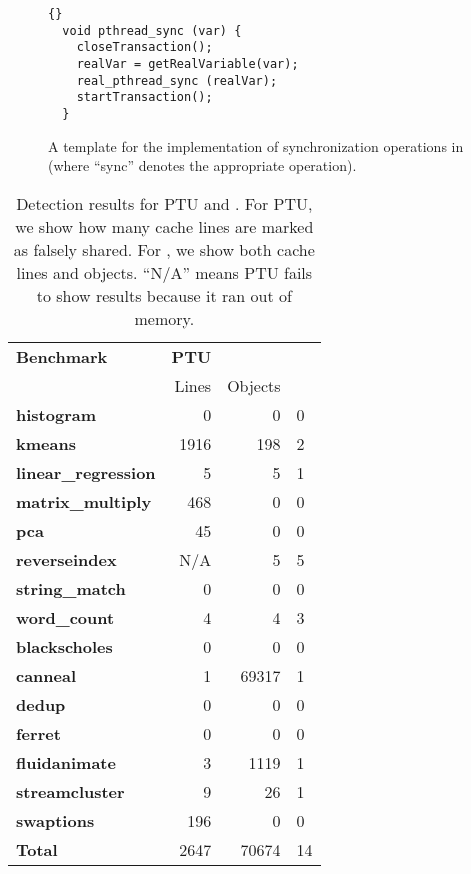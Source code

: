 \begin{figure}[!t]
\small
\begin{lstlisting}[frame=trbl]{}
  void pthread_sync (var) {
    closeTransaction();
    realVar = getRealVariable(var);
    real_pthread_sync (realVar);
    startTransaction();
  }
\end{lstlisting}
\caption{A template for the implementation of synchronization
  operations in \sheriff{} (where ``sync'' denotes the appropriate operation).\label{fig:synccode}}
\end{figure}


\begin{table}[!t]
\centering
\begin{tabular}{|l|r|r|}
\hline
{\bf \small Benchmark} & {\bf \small PTU} &  \\
 & {Lines} & {Objects}\\
\hline
\small \textbf{histogram} & 0 & 0 & 0 \\
\small \textbf{kmeans} & 1916 & 198 & 2 \\
\small \textbf{linear\_regression} & 5 & 5 & 1 \\
\small \textbf{matrix\_multiply} & 468 & 0 & 0\\
\small \textbf{pca} & 45 & 0 & 0 \\
\small \textbf{reverseindex} & N/A & 5 & 5 \\
\small \textbf{string\_match} & 0 & 0 & 0 \\
\small \textbf{word\_count} & 4 & 4 & 3\\
\hline
\small \textbf{blackscholes} & 0 & 0 &  0 \\
\small \textbf{canneal} & 1 & 69317 & 1 \\
\small \textbf{dedup} & 0 & 0 & 0 \\
\small \textbf{ferret} & 0 & 0 & 0\\
\small \textbf{fluidanimate} & 3 & 1119 & 1 \\
\small \textbf{streamcluster} & 9 & 26 & 1\\
\small \textbf{swaptions} & 196 & 0 & 0\\
\hline
\small \textbf{Total} & 2647 & 70674 & 14\\
\hline
\end{tabular}
\caption{Detection results for PTU and \sheriffdetect{}. For PTU, we show 
how many cache lines are marked as falsely shared. For \sheriffdetect{},
we show both cache lines and objects. 
``N/A'' means PTU fails to show results because it ran out of memory.
\label{table:detection}}
\end{table}


